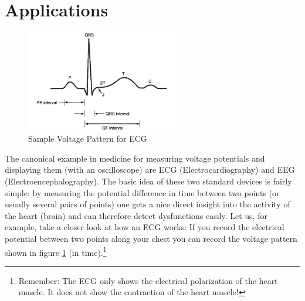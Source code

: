 \section{Applications}

\begin{figure}[h]
    \begin{center}
        \includegraphics[width=0.6\textwidth]{./Exp1/pic/image5.png}
    \end{center}
    \caption{Sample Voltage Pattern for ECG}
    \label{fig:ecgpattern}
\end{figure}

The canonical example in medicine for measuring voltage potentials and displaying them (with an oscilloscope) are ECG (Electrocardiography) and EEG (Electroencephalography). The basic idea of these two standard devices is fairly simple: by measuring the potential difference in time between two points (or usually several pairs of points) one gets a nice direct insight into the activity of the heart (brain) and can therefore detect dysfunctions easily. Let us, for example, take a closer look at how an ECG works: If you record the electrical potential between two points along your chest you can record the voltage pattern shown in figure \ref{fig:ecgpattern} (in time).\footnote{Remember: The ECG only shows the electrical polarization of the heart muscle. It does not show the contraction of the heart muscle!} \myskip

